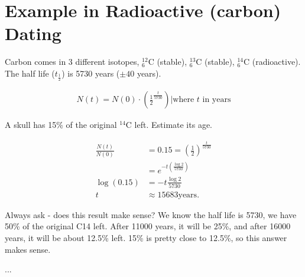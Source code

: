 \section{Example in Radioactive (carbon) Dating}
Carbon comes in 3 different isotopes,  $^{12}_{6}$C (stable),
$^{13}_{6}$C (stable), $^{14}_{6}$C (radioactive). The half life
($t_\frac{1}{2}$) is 5730 years ($\pm 40$ years).

\begin{align}
  N(t) = N(0)\cdot(\frac{1}{2}^{\frac{t}{5730}}) | \text{where $t$ in years}
\end{align}

A skull has 15\% of the original $^{14}$C left. Estimate its age.

\begin{align}
  \frac{N(t)}{N(0)} &= 0.15 = (\frac{1}{2})^{\frac{t}{5730}} \\
  &= e^{-t(\frac{\log2}{5730})} \\
  \log(0.15) &= -t \frac{\log2}{5730} \\
  t &\approx 15683 \text{years}.
\end{align}

Always ask - does this result make sense? We know the half life is 5730, we have
50\% of the original C14 left. After 11000 years, it will be 25\%, and after
16000 years, it will be about 12.5\% left. 15\% is pretty close to 12.5\%, so
this answer makes sense.

...
